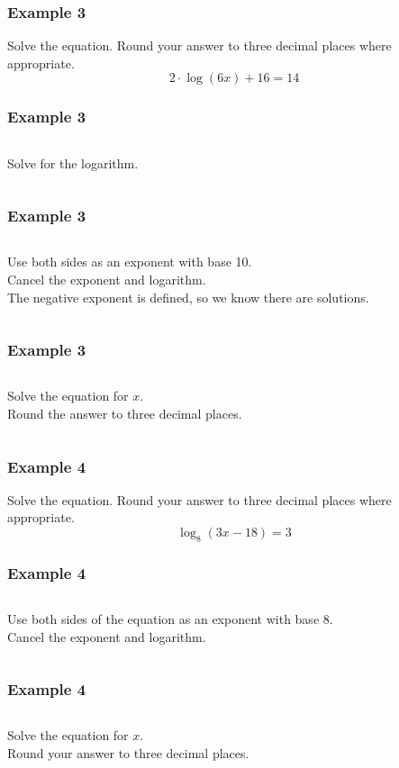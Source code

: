\documentclass[aspectratio=169,17pt]{beamer}
\begin{document}
\begin{frame}[t]
	\frametitle{Example 3}
	Solve the equation. Round your answer to three decimal places where appropriate.
	$$2 \cdot \log\left(6x\right) + 16 = 14$$
\end{frame}

\begin{frame}
	\frametitle{Example 3}
	\begin{columns}
			Solve for the logarithm.
			
	\end{columns}
\end{frame}

\begin{frame}
	\frametitle{Example 3}
	\begin{columns}
		 {\small
			Use both sides as an exponent with base 10. \\
			Cancel the exponent and logarithm. \\
			The negative exponent is defined, so we know there are solutions. }
		\column{0.7\textwidth}
			
	\end{columns}
\end{frame}

\begin{frame}
	\frametitle{Example 3}
	\begin{columns}
		\column{0.3\textwidth}
			Solve the equation for $x$. \\ Round the answer to three decimal places.
			
	\end{columns}
\end{frame}

\begin{frame}[t]
	\frametitle{Example 4}
	Solve the equation. Round your answer to three decimal places where appropriate.
	$$\log_8{\left(3x-18\right)} = 3$$
\end{frame}

\begin{frame}
	\frametitle{Example 4}
	\begin{columns}
		\column{0.3\textwidth}
			Use both sides of the equation as an exponent with base $8$. \\
			Cancel the exponent and logarithm.
		\column{0.7\textwidth}
			
	\end{columns}
\end{frame}

\begin{frame}
	\frametitle{Example 4}
	\begin{columns}
			Solve the equation for $x$. \\ Round your answer to three decimal places.
			
	\end{columns}
\end{frame}
\end{document}
